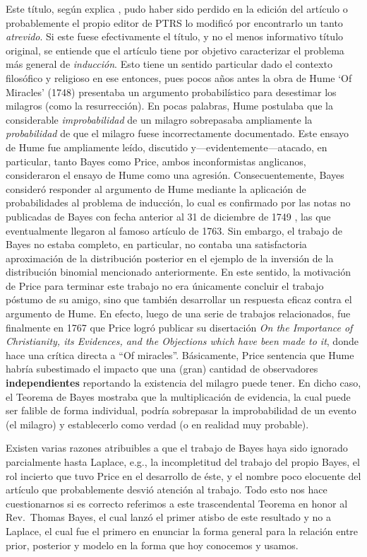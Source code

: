 \begin{mdframed}[style=discusion, frametitle={\center ¿Qué hizo efectivamente Bayes y por qué?}]
Este título, según explica \cite{stigler2013}, pudo haber sido perdido en la edición del artículo o probablemente el propio editor de PTRS lo modificó por encontrarlo un tanto \emph{atrevido}.  Si este fuese efectivamente el título, y no el menos informativo título original, se entiende que el artículo tiene por objetivo caracterizar  el problema más general de \emph{inducción}. Esto tiene un sentido particular dado el contexto filosófico y religioso en ese entonces, pues pocos años antes la obra de Hume `Of Miracles' (1748) presentaba un argumento probabilístico para desestimar los milagros (como la resurrección). En  pocas  palabras, Hume postulaba que la considerable \emph{improbabilidad} de un milagro sobrepasaba ampliamente la \emph{probabilidad}  de  que el milagro fuese incorrectamente  documentado. Este ensayo de Hume fue ampliamente leído, discutido y---evidentemente---atacado, en particular, tanto Bayes como Price, ambos inconformistas anglicanos, consideraron  el ensayo de Hume como una agresión. Consecuentemente, Bayes consideró responder al argumento de  Hume mediante la aplicación de probabilidades al problema de inducción, lo cual es confirmado por las notas no publicadas de Bayes con fecha anterior al 31 de diciembre de 1749 \cite{bellhouse_2004}, las que eventualmente llegaron al famoso artículo de 1763. Sin embargo, el trabajo de Bayes no estaba completo, en particular, no contaba una satisfactoria aproximación de la distribución posterior en el ejemplo de la inversión de la distribución binomial mencionado anteriormente. En este sentido, la motivación de Price para terminar este trabajo no era únicamente concluir el trabajo póstumo de su amigo, sino que también desarrollar un respuesta eficaz contra el argumento de Hume. En efecto, luego de una serie de  trabajos relacionados, fue  finalmente en 1767 que Price logró publicar su disertación \emph{On the Importance of Christianity, its Evidences, and the Objections which have been made to it}, donde hace una crítica directa a “Of miracles”. Básicamente, Price sentencia que Hume habría subestimado el impacto que una (gran) cantidad de observadores \textbf{independientes} reportando la existencia del milagro puede tener. En dicho caso, el Teorema de Bayes mostraba que la multiplicación de evidencia, la cual puede ser falible de forma individual, podría sobrepasar la improbabilidad de un evento (el milagro) y establecerlo como verdad (o en realidad muy probable). 

Existen varias razones atribuibles a que el trabajo de Bayes haya sido ignorado parcialmente hasta Laplace, e.g., la incompletitud del trabajo del propio Bayes, el rol incierto que tuvo Price en el desarrollo de éste, y el nombre poco elocuente del artículo que probablemente desvió atención al trabajo. Todo esto nos hace cuestionarnos si es correcto referimos a este trascendental Teorema en honor al Rev.~Thomas Bayes, el cual lanzó el primer atisbo de este resultado y no a Laplace, el cual fue el primero en enunciar la forma general para la relación entre prior, posterior y modelo en la forma que hoy conocemos y usamos. 
\end{mdframed}

